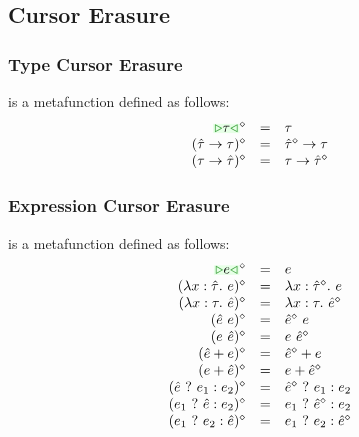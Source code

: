 \documentclass{article}
\begin{document}
\subsection{Cursor Erasure}
\subsubsection{Type Cursor Erasure}
\judgbox{\ensuremath{\cursorErase{\ZTMV}}} is a metafunction defined as follows:
%
\newcommand{\cursorErasesToRow}[2]{\ensuremath{\cursorErase{#1} & = & #2}}
\[\begin{array}{rcl}
  \cursorErasesToRow{\ZTCursor{\TMV}}{\TMV} \\
  \cursorErasesToRow{(\ZTArrowL{\ZTMV}{\TMV})}{\TArrow{\cursorErase{\ZTMV}}{\TMV}} \\
  \cursorErasesToRow{(\ZTArrowR{\TMV}{\ZTMV})}{\TArrow{\TMV}{\cursorErase{\ZTMV}}} \\
\end{array}\]

\subsubsection{Expression Cursor Erasure}
\judgbox{\ensuremath{\cursorErase{\ZMV}}} is a metafunction defined as follows:
%
\[\begin{array}{rcl}
  \cursorErasesToRow{\ZCursor{\EMV}}{\EMV} \\
  \cursorErasesToRow{(\ZLamT{x}{\ZTMV}{\EMV})}{\ELam{x}{\cursorErase{\ZTMV}}{\EMV}} \\
  \cursorErasesToRow{(\ZLamE{x}{\TMV}{\ZMV})}{\ELam{x}{\TMV}{\cursorErase{\ZMV}}} \\
  \cursorErasesToRow{(\ZApL{\ZMV}{\EMV})}{\EAp{\cursorErase{\ZMV}}{\EMV}} \\
  \cursorErasesToRow{(\ZApR{\EMV}{\ZMV})}{\EAp{\EMV}{\cursorErase{\ZMV}}} \\
  \cursorErasesToRow{(\ZPlusL{\ZMV}{\EMV})}{\EPlus{\cursorErase{\ZMV}}{\EMV}} \\
  \cursorErasesToRow{(\ZPlusR{\EMV}{\ZMV})}{\EPlus{\EMV}{\cursorErase{\ZMV}}} \\
  \cursorErasesToRow{(\ZIfC{\ZMV}{\EMV_1}{\EMV_2})}{\EIf{\cursorErase{\ZMV}}{\EMV_1}{\EMV_2}} \\
  \cursorErasesToRow{(\ZIfL{\EMV_1}{\ZMV}{\EMV_2})}{\EIf{\EMV_1}{\cursorErase{\ZMV}}{\EMV_2}} \\
  \cursorErasesToRow{(\ZIfL{\EMV_1}{\EMV_2}{\ZMV})}{\EIf{\EMV_1}{\EMV_2}{\cursorErase{\ZMV}}} \\
\end{array}\]
\end{document}
